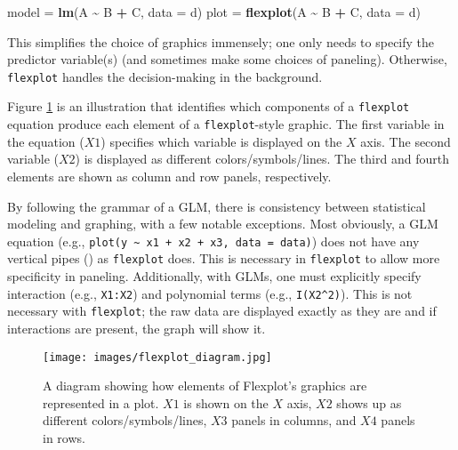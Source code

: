 \documentclass[
  english,
  man]{apa6}
\newenvironment{Shaded}{\begin{snugshade}}{\end{snugshade}}
\newcommand{\DataTypeTok}[1]{\textcolor[rgb]{0.13,0.29,0.53}{#1}}
\newcommand{\KeywordTok}[1]{\textcolor[rgb]{0.13,0.29,0.53}{\textbf{#1}}}
\newcommand{\NormalTok}[1]{#1}
\newcommand{\OperatorTok}[1]{\textcolor[rgb]{0.81,0.36,0.00}{\textbf{#1}}}
\newcommand{\StringTok}[1]{\textcolor[rgb]{0.31,0.60,0.02}{#1}}
\begin{document}
\small

\begin{Shaded}
\begin{Highlighting}[]
\NormalTok{model =}\StringTok{       }\KeywordTok{lm}\NormalTok{(A }\OperatorTok{\textasciitilde{}}\StringTok{ }\NormalTok{B }\OperatorTok{+}\StringTok{ }\NormalTok{C, }\DataTypeTok{data =}\NormalTok{ d)}
\NormalTok{plot  =}\StringTok{ }\KeywordTok{flexplot}\NormalTok{(A }\OperatorTok{\textasciitilde{}}\StringTok{ }\NormalTok{B }\OperatorTok{+}\StringTok{ }\NormalTok{C, }\DataTypeTok{data =}\NormalTok{ d)}
\end{Highlighting}
\end{Shaded}

\normalsize

This simplifies the choice of graphics immensely; one only needs to specify the predictor variable(s) (and sometimes make some choices of paneling). Otherwise, \texttt{flexplot} handles the decision-making in the background.

Figure \ref{fig:flexplotgrammar} is an illustration that identifies which components of a \texttt{flexplot} equation produce each element of a \texttt{flexplot}-style graphic. The first variable in the equation (\(X1\)) specifies which variable is displayed on the \(X\) axis. The second variable (\(X2\)) is displayed as different colors/symbols/lines. The third and fourth elements are shown as column and row panels, respectively.

By following the grammar of a GLM, there is consistency between statistical modeling and graphing, with a few notable exceptions. Most obviously, a GLM equation (e.g., \texttt{plot(y\ \textasciitilde{}\ x1\ +\ x2\ +\ x3,\ data\ =\ data)}) does not have any vertical pipes (\texttt{\textbar{}}) as \texttt{flexplot} does. This is necessary in \texttt{flexplot} to allow more specificity in paneling. Additionally, with GLMs, one must explicitly specify interaction (e.g., \texttt{X1:X2}) and polynomial terms (e.g., \texttt{I(X2\^{}2)}). This is not necessary with \texttt{flexplot}; the raw data are displayed exactly as they are and if interactions are present, the graph will show it.

\begin{figure}
\centering
\texttt{[image: images/flexplot\_diagram.jpg]}
\caption{A diagram showing how elements of Flexplot's graphics are represented in a plot. $X1$ is shown on the $X$ axis, $X2$ shows up as different colors/symbols/lines, $X3$ panels in columns, and $X4$ panels in rows.}
\label{fig:flexplotgrammar}
\end{figure}
\end{document}

